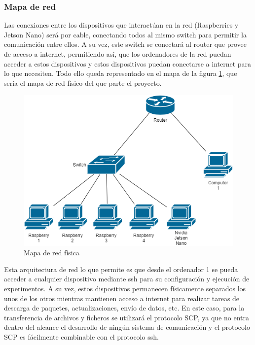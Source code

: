 \subsubsection{Mapa de red}
Las conexiones entre los dispositivos que interactúan en la red (Raspberries y Jetson Nano) será por cable, conectando todos al mismo switch para permitir la comunicación entre ellos. A su vez, este switch se conectará al router que provee de acceso a internet, permitiendo así, que los ordenadores de la red puedan acceder a estos dispositivos y estos dispositivos puedan conectarse a internet para lo que necesiten. Todo ello queda representado en el mapa de la figura \ref{fig:MapaRed}, que sería el mapa de red físico del que parte el proyecto.
\begin{figure}[H]
    \centering
    \includegraphics[width=\textwidth]{Figuras/Network_map.png}    
    \caption{Mapa de red física} 
    \label{fig:MapaRed}
\end{figure}

Esta arquitectura de red lo que permite es que desde el ordenador 1 se pueda acceder a cualquier dispositivo mediante ssh para su configuración y ejecución de experimentos. A su vez, estos dispositivos permanecen físicamente separados los unos de los otros mientras mantienen acceso a internet para realizar tareas de descarga de paquetes, actualizaciones, envío de datos, etc. En este caso, para la transferencia de archivos y ficheros se utilizará el protocolo SCP, ya que no entra dentro del alcance el desarrollo de ningún sistema de comunicación y el protocolo SCP es fácilmente combinable con el protocolo ssh.

\pagebreak

